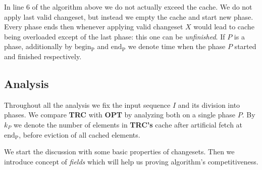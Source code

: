 In line 6 of the algorithm above we do not actually exceed the cache. We 
do not apply last valid changeset, but instead we empty the cache and start new 
phase. 
Every phase ends then whenever applying valid changeset $X$ would lead to cache 
being overloaded except of the last phase: this one can be \textit{unfinished}. 
If $P$ is a phase, additionally by $\mathrm{begin_P}$ and $\mathrm{end_P}$ we 
denote time when the phase $P$ started and finished respectively.

\subsection{Analysis}
Throughout all the analysis we fix the input sequence $I$ and its division into 
phases. We compare \textbf{TRC} with \textbf{OPT} by analyzing both on a single 
phase $P$. By $k_P$ we denote the number of elements in \textbf{TRC's} cache 
after artificial fetch at $\mathrm{end_P}$, before eviction of all cached 
elements.

We start the discussion with some basic properties of changesets. Then we 
introduce concept of
\textit{fields} which will help us proving algorithm's competitiveness.

